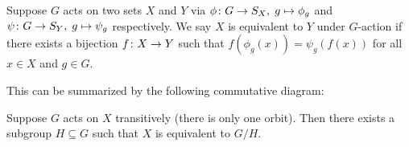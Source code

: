 \begin{definition}
    Suppose \(G\) acts on two sets \(X\) and \(Y\)
    via \(\phi\colon G\to S_X,\;g\mapsto\phi_g\)
    and \(\psi\colon G\to S_Y,\;g\mapsto\psi_g\) respectively.
    We say \(X\) is equivalent to \(Y\) under \(G\)-action
    if there exists a bijection \(f\colon X\to Y\)
    such that \(f(\phi_g(x)) = \psi_g(f(x))\)
    for all \(x \in X\) and \(g \in G\).

    This can be summarized by the following commutative diagram:
    \begin{center}
    \end{center}
\end{definition}
\begin{lemma}\label{lem:transitive-orbit-subgroup}
    Suppose \(G\) acts on \(X\) transitively (there is only one orbit).
    Then there exists a subgroup \(H \subseteq G\)
    such that \(X\) is equivalent to \(G/H\).
\end{lemma}
